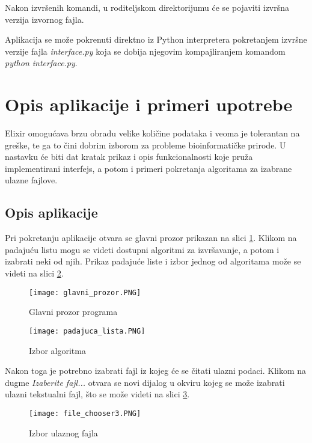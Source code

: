 \documentclass[12pt,oneside]{memoir}
\begin{document}
\noindent Nakon izvršenih komandi, u roditeljskom direktorijumu će se pojaviti izvršna verzija izvornog fajla.



Aplikacija se može pokrenuti direktno iz Python interpretera pokretanjem izvršne verzije fajla \textit{interface.py} koja se dobija njegovim kompajliranjem komandom \textit{python interface.py}.

\section{Opis aplikacije i primeri upotrebe}
\label{odeljak:OpisPrimeriUpotrebe}

Elixir omogućava brzu obradu velike količine podataka i veoma je tolerantan na greške, te ga to čini dobrim izborom za probleme bioinformatičke prirode. U nastavku će biti dat kratak prikaz i opis funkcionalnosti koje pruža implementirani interfejs, a potom i primeri pokretanja algoritama za izabrane ulazne fajlove.

\subsection{Opis aplikacije}

Pri pokretanju aplikacije otvara se glavni prozor prikazan na slici \ref{fig:glavniProzor}. Klikom na padajuću listu mogu se videti dostupni algoritmi za izvršavanje, a potom i izabrati neki od njih. Prikaz padajuće liste i izbor jednog od algoritama može se videti na slici \ref{fig:padajucaLista}. 

\begin{figure}[h]
\centering
\texttt{[image: glavni\_prozor.PNG]}
\caption{Glavni prozor programa}
\label{fig:glavniProzor}
\end{figure}

\begin{figure}[h]
\centering
\texttt{[image: padajuca\_lista.PNG]}
\caption{Izbor algoritma}
\label{fig:padajucaLista}
\end{figure}

Nakon toga je potrebno izabrati fajl iz kojeg će se čitati ulazni podaci. Klikom na dugme \textit{Izaberite fajl...} otvara se novi dijalog u okviru kojeg se može izabrati ulazni tekstualni fajl, što se može videti na slici \ref{fig:fileChooser}.

\begin{figure}[h]
\centering
\texttt{[image: file\_chooser3.PNG]}
\caption{Izbor ulaznog fajla}
\label{fig:fileChooser}
\end{figure}
\end{document}

